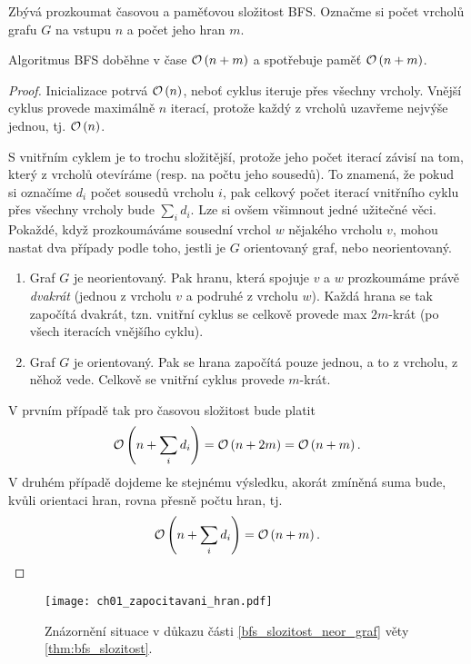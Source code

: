 Zbývá prozkoumat časovou a paměťovou složitost BFS. Označme si počet vrcholů grafu $G$ na vstupu $n$ a počet jeho hran $m$. 
\begin{theorem}\label{thm:bfs_slozitost}
    Algoritmus BFS doběhne v čase $\mathcal{O}\left(n+m\right)$ a spotřebuje paměť $\mathcal{O}\left(n+m\right)$.
\end{theorem}
\begin{proof}
    Inicializace potrvá $\mathcal{O}\left(n\right)$, neboť cyklus iteruje přes všechny vrcholy. Vnější cyklus provede maximálně $n$ iterací, protože každý z vrcholů uzavřeme nejvýše jednou, tj. $\mathcal{O}\left(n\right)$.

    S vnitřním cyklem je to trochu složitější, protože jeho počet iterací závisí na tom, který z vrcholů otevíráme (resp. na počtu jeho sousedů). To znamená, že pokud si označíme $d_i$ počet sousedů vrcholu $i$, pak celkový počet iterací vnitřního cyklu přes všechny vrcholy bude $\sum_i{d_i}$. Lze si ovšem všimnout jedné užitečné věci. Pokaždé, když prozkoumáváme sousední vrchol $w$ nějakého vrcholu $v$, mohou nastat dva případy podle toho, jestli je $G$ orientovaný graf, nebo neorientovaný.
    \begin{enumerate}[label=(\roman*)]
        \item\label{bfs_slozitost_neor_graf} Graf $G$ je neorientovaný. Pak hranu, která spojuje $v$ a $w$ prozkoumáme právě \emph{dvakrát} (jednou z vrcholu $v$ a podruhé z vrcholu $w$). Každá hrana se tak započítá dvakrát, tzn. vnitřní cyklus se celkově provede max $2m$-krát (po všech iteracích vnějšího cyklu).
        \item\label{bfs_slozitost_or_graf} Graf $G$ je orientovaný. Pak se hrana započítá pouze jednou, a to z vrcholu, z něhož vede. Celkově se vnitřní cyklus provede $m$-krát.
    \end{enumerate}
    V prvním případě tak pro časovou složitost bude platit
    \[\mathcal{O}\left(n+\sum_i{d_i}\right)=\mathcal{O}\left(n+2m\right)=\mathcal{O}\left(n+m\right).\]
    V druhém případě dojdeme ke stejnému výsledku, akorát zmíněná suma bude, kvůli orientaci hran, rovna přesně počtu hran, tj.
    \[\mathcal{O}\left(n+\sum_i{d_i}\right)=\mathcal{O}\left(n+m\right).\]
\end{proof}
\begin{figure}[h]
    \centering
    \texttt{[image: ch01\_zapocitavani\_hran.pdf]}
    \caption{Znázornění situace v důkazu části \ref{bfs_slozitost_neor_graf} věty \ref{thm:bfs_slozitost}.}
\end{figure}